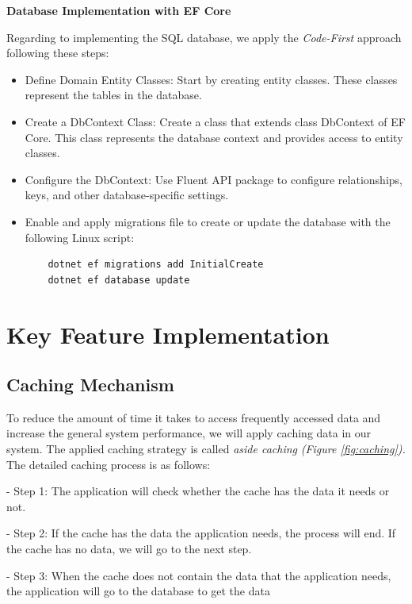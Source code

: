 \textbf{Database Implementation with EF Core}

Regarding to implementing the SQL database, we apply the \textit{Code-First} approach following these steps:
\begin{itemize}
  \item Define Domain Entity Classes:
  Start by creating entity classes. These classes represent the tables in the database.

  \item Create a DbContext Class:
  Create a class that extends class DbContext of EF Core. This class represents the database context and provides access to entity classes.

  \item Configure the DbContext:
  Use Fluent API package to configure relationships, keys, and other database-specific settings.

  \item Enable and apply migrations file to create or update the database with the following Linux script:
  \begin{lstlisting}
    dotnet ef migrations add InitialCreate
    dotnet ef database update
  \end{lstlisting}
\end{itemize}

\newpage
\section{Key Feature Implementation}

\subsection{Caching Mechanism}

To reduce the amount of time it takes to access frequently accessed data
and increase the general system performance, we will apply caching data
in our system. The applied caching strategy is called \emph{aside
    caching} \emph{(Figure \ref{fig:caching}).} The detailed caching process is as follows:

- Step 1: The application will check whether the cache has the data it
needs or not.

- Step 2: If the cache has the data the application needs, the process
will end. If the cache has no data, we will go to the next step.

- Step 3: When the cache does not contain the data that the application
needs, the application will go to the database to get the data

